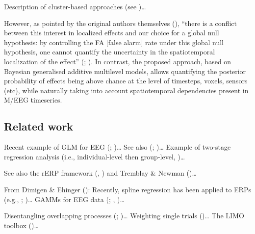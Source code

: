 \documentclass[
  doc,
  floatsintext,
  longtable,
  a4paper,
  nolmodern,
  notxfonts,
  notimes,
  colorlinks=true,linkcolor=blue,citecolor=blue,urlcolor=blue]{apa7}
\begin{document}
Description of cluster-based approaches (see
)\ldots{}

However, as pointed by the original authors themselves
(), ``there is a
conflict between this interest in localized effects and our choice for a
global null hypothesis: by controlling the FA {[}false alarm{]} rate
under this global null hypothesis, one cannot quantify the uncertainty
in the spatiotemporal localization of the effect''
(;
). In
contrast, the proposed approach, based on Bayesian generalised additive
multilevel models, allows quantifying the posterior probability of
effects being above chance at the level of timesteps, voxels, sensors
(etc), while naturally taking into account spatiotemporal dependencies
present in M/EEG timeseries.

\subsection{Related work}\label{related-work}

Recent example of GLM for EEG (; )\ldots{} See also (;
)\ldots{} Example of
two-stage regression analysis (i.e., individual-level then group-level,
)\ldots{}

See also the rERP framework (, ) and Tremblay \& Newman
()\ldots{}

From Dimigen \& Ehinger (): Recently,
spline regression has been applied to ERPs (e.g.,
;
)\ldots{} GAMMs
for EEG data (;
,
)\ldots{}

Disentangling overlapping processes
(;
)\ldots{}
Weighting single trials ()\ldots{} The LIMO toolbox ()\ldots{}
\end{document}

